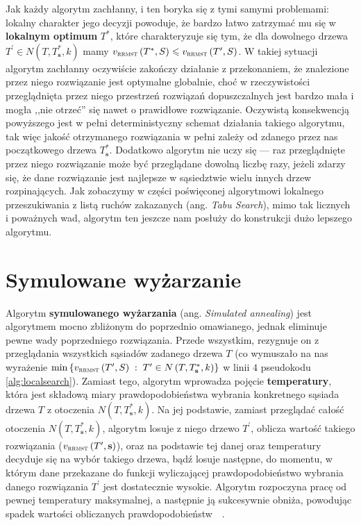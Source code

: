 Jak każdy algorytm zachłanny, i ten boryka się z tymi samymi problemami: lokalny charakter jego decyzji powoduje, że bardzo łatwo zatrzymać mu się w \textbf{lokalnym optimum} $T^{\ast}$, które charakteryzuje się tym, że dla dowolnego drzewa $T^{\prime} \in N \left( T, T^{\ast}_{\textbf{s}}, k \right)$ mamy $v_{\textsc{rrmst}} \left( T^{\ast}, S \right) \leqslant v_{\textsc{rrmst}} \left( T^{\prime}, S \right)$. W takiej sytuacji algorytm zachłanny oczywiście zakończy działanie z przekonaniem, że znalezione przez niego rozwiązanie jest optymalne globalnie, choć w rzeczywistości przeglądnięta przez niego przestrzeń rozwiązań dopuszczalnych jest bardzo mała i mogła ,,nie otrzeć'' się nawet o prawidłowe rozwiązanie. Oczywistą konsekwencją powyższego jest w pełni deterministyczny schemat działania takiego algorytmu, tak więc jakość otrzymanego rozwiązania w pełni zależy od zdanego przez nas początkowego drzewa $T^{\ast}_{\textbf{s}}$. Dodatkowo algorytm nie uczy się --- raz przeglądnięte przez niego rozwiązanie może być przeglądane dowolną liczbę razy, jeżeli zdarzy się, że dane rozwiązanie jest najlepsze w sąsiedztwie wielu innych drzew rozpinających. Jak zobaczymy w części poświęconej algorytmowi lokalnego przeszukiwania z listą ruchów zakazanych (ang. \textit{Tabu Search}), mimo tak licznych i poważnych wad, algorytm ten jeszcze nam posłuży do konstrukcji dużo lepszego algorytmu.

\section{Symulowane wyżarzanie}

Algorytm \textbf{symulowanego wyżarzania} (ang. \textit{Simulated annealing}) jest algorytmem mocno zbliżonym do poprzednio omawianego, jednak eliminuje pewne wady poprzedniego rozwiązania. Przede wszystkim, rezygnuje on z przeglądania wszystkich sąsiadów zadanego drzewa $T$ (co wymuszało na nas wyrażenie $\min \left\{ v_{\textsc{rrmst}} \left( T^{\prime}, S \right) \; : \; T^{\prime} \in N \left( T, T^{\ast}_{\textbf{s}}, k \right) \right\}$ w linii $4$ pseudokodu \ref{alg:localsearch}). Zamiast tego, algorytm wprowadza pojęcie \textbf{temperatury}, która jest składową miary prawdopodobieństwa wybrania konkretnego sąsiada drzewa $T$ z otoczenia $N \left( T, T^{\ast}_{\textbf{s}}, k \right)$. Na jej podstawie, zamiast przeglądać całość otoczenia $N \left( T, T^{\ast}_{\textbf{s}}, k \right)$, algorytm losuje z niego drzewo $T^{\prime}$, oblicza wartość takiego rozwiązania ($v_{\textsc{rrmst}} \left( T^{\prime}, \textbf{s} \right)$), oraz na podstawie tej danej oraz temperatury decyduje się na wybór takiego drzewa, bądź losuje następne, do momentu, w którym dane przekazane do funkcji wyliczającej prawdopodobieństwo wybrania danego rozwiązania $T^{\prime}$ jest dostatecznie wysokie. Algorytm rozpoczyna pracę od pewnej temperatury maksymalnej, a następnie ją sukcesywnie obniża, powodując spadek wartości obliczanych prawdopodobieństw~\cite{Nikulin2008}~\cite{Jany2015}.


